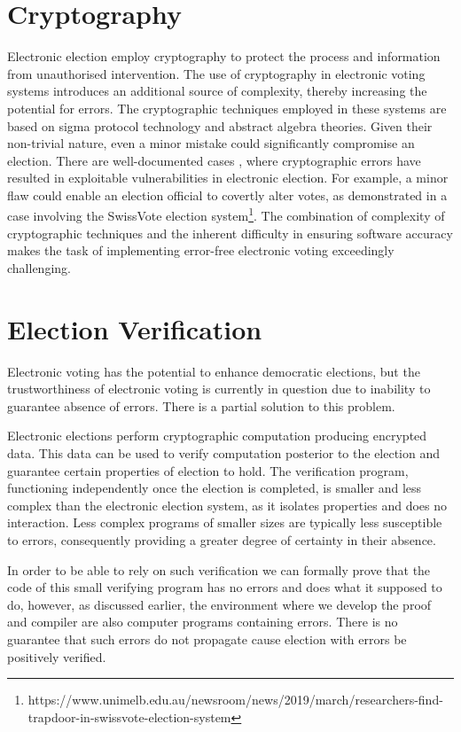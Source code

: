 \section{Cryptography}
Electronic election employ cryptography to protect the process and 
information from unauthorised intervention. The use of cryptography 
in electronic voting systems introduces an additional source of complexity, 
thereby increasing the potential for errors. The cryptographic techniques 
employed in these systems are based on sigma protocol technology and abstract 
algebra theories. Given their non-trivial nature, even a minor mistake could 
significantly compromise an election. There are well-documented 
cases \cite{Halderman2015TheNS, Springall2014SecurityAO, Haines2022RunningTR}, where 
cryptographic errors have resulted in exploitable vulnerabilities in electronic election. 
For example, a minor flaw could enable an election official to covertly alter votes, as 
demonstrated in a case involving the SwissVote 
election 
system\footnote{https://www.unimelb.edu.au/newsroom/news/2019/march/researchers-find-trapdoor-in-swissvote-election-system}. 
The combination of complexity of cryptographic techniques and the inherent difficulty 
in ensuring software accuracy makes the task of implementing error-free electronic voting exceedingly challenging.
\section{Election Verification} 
Electronic voting has the potential to enhance democratic elections, 
but the trustworthiness of electronic voting is currently in question 
due to inability to guarantee absence of errors. There is a partial solution to this problem. 

Electronic elections perform  cryptographic computation producing encrypted data. This data can be used to 
verify computation posterior to the election and guarantee certain properties of election to hold. The 
verification program, functioning independently once the election is completed, is smaller and less 
complex than the electronic election system, as it isolates properties and does no interaction. Less 
complex programs of smaller sizes are typically less susceptible to errors, consequently providing a 
greater degree of certainty in their absence. 

In order to be able to rely on such verification we can formally prove that the code of this small 
verifying program has no errors and does what it supposed to do, however, as discussed earlier, the 
environment where we develop the proof and compiler are also computer programs containing errors. 
There is no guarantee that such errors do not propagate cause election with errors be positively verified.
